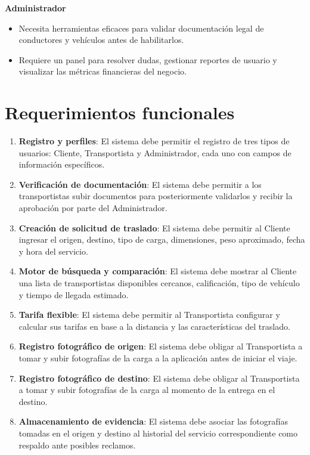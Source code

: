  \noindent \textbf{Administrador}
 
 \begin{itemize}
 	\item Necesita herramientas eficaces para validar documentación legal de conductores y vehículos antes de habilitarlos.
 	\item Requiere un panel para resolver dudas, gestionar reportes de usuario y visualizar las métricas financieras del negocio.
 \end{itemize}
 
 \section{Requerimientos funcionales}
 
 \begin{enumerate}
 	\item \textbf{Registro y perfiles}: El sistema debe permitir el registro de tres tipos de usuarios: Cliente, Transportista y Administrador, cada uno con campos de información específicos.
 	\item \textbf{Verificación de documentación}: El sistema debe permitir a los transportistas subir documentos para posteriormente validarlos y recibir la aprobación por parte del Administrador.
 	\item \textbf{Creación de solicitud de traslado}: El sistema debe permitir al Cliente ingresar el origen, destino, tipo de carga, dimensiones, peso aproximado, fecha y hora del servicio.
 	\item \textbf{Motor de búsqueda y comparación}: El sistema debe mostrar al Cliente una lista de transportistas disponibles cercanos, calificación, tipo de vehículo y tiempo de llegada estimado.
 	\item \textbf{Tarifa flexible}: El sistema debe permitir al Transportista configurar y calcular sus tarifas en base a la distancia y las características del traslado.
 	\item \textbf{Registro fotográfico de origen}: El sistema debe obligar al Transportista a tomar y subir fotografías de la carga a la aplicación antes de iniciar el viaje.
 	\item \textbf{Registro fotográfico de destino}: El sistema debe obligar al Transportista a tomar y subir fotografías de la carga al momento de la entrega en el destino.
 	\item \textbf{Almacenamiento de evidencia}: El sistema debe asociar las fotografías tomadas en el origen y destino al historial del servicio correspondiente como respaldo ante posibles reclamos.

\end{enumerate}
